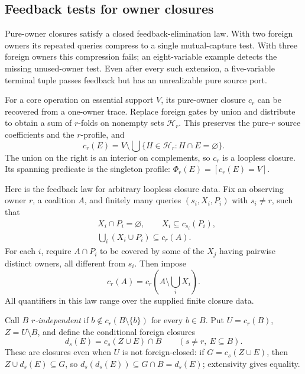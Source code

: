 \subsection{Feedback tests for owner closures}
\label{app:core-feedback}

Pure-owner closures satisfy a closed feedback-elimination law.
With two foreign owners its repeated queries compress to a single
mutual-capture test. With three foreign owners this compression fails;
an eight-variable example detects the missing unused-owner test.
Even after every such extension, a five-variable terminal tuple passes
feedback but has an unrealizable pure source port.

For a core operation on essential support $V$, its pure-owner closure
$c_r$ can be recovered from a one-owner trace. Replace foreign gates
by union and distribute to obtain a sum of $r$-folds on nonempty sets
$\mathcal H_r$. This preserves the pure-$r$ source coefficients and
the $r$-profile, and
\[
 c_r(E)=V\setminus\bigcup\{H\in\mathcal H_r:H\cap E=\varnothing\}.
\]
The union on the right is an interior on complements, so $c_r$ is a
loopless closure. Its spanning predicate is the singleton profile:
$\Phi_r(E)=[c_r(E)=V]$.

Here is the feedback law for arbitrary loopless closure data. Fix an
observing owner $r$, a coalition $A$, and finitely many queries
$(s_i,X_i,P_i)$ with $s_i\ne r$, such that
\begin{align*}
 &X_i\cap P_i=\varnothing,\qquad X_i\subseteq c_{s_i}(P_i),\\
 &\bigcup_i(X_i\cup P_i)\subseteq c_r(A).
\end{align*}
For each $i$, require $A\cap P_i$ to be covered by some of the $X_j$
having pairwise distinct owners, all different from $s_i$. Then impose
\begin{equation}\label{core:eq:feedback-elimination}
 c_r(A)=c_r\left(A\setminus\bigcup_iX_i\right).\tag{FE}
\end{equation}
All quantifiers in this law range over the supplied finite closure data.

Call $B$ \emph{$r$-independent} if
$b\notin c_r(B\setminus\{b\})$ for every $b\in B$. Put
$U=c_r(B)$, $Z=U\setminus B$, and define the conditional foreign closures
\begin{equation}\label{core:eq:conditional-foreign-closure}
 d_s(E)=c_s(Z\cup E)\cap B\qquad(s\ne r,\ E\subseteq B).
\end{equation}
These are closures even when $U$ is not foreign-closed: if
$G=c_s(Z\cup E)$, then $Z\cup d_s(E)\subseteq G$, so
$d_s(d_s(E))\subseteq G\cap B=d_s(E)$; extensivity gives equality.


